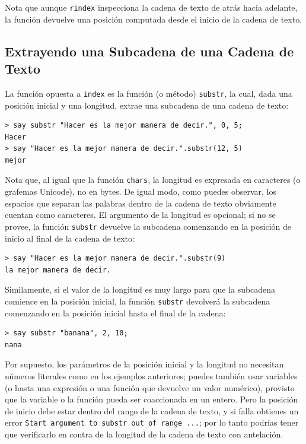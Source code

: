 Nota que aunque {\tt rindex} inspecciona la cadena de texto
de atrás hacia adelante, la función devuelve una posición
computada desde el inicio de la cadena de texto.

\subsection{Extrayendo una Subcadena de una Cadena de Texto}

La función opuesta a {\tt index} es la función (o método) {\tt substr},
la cual, dada una posición inicial y una longitud, extrae una subcadena
de una cadena de texto:

\begin{lstlisting}
> say substr "Hacer es la mejor manera de decir.", 0, 5;
Hacer
> say "Hacer es la mejor manera de decir.".substr(12, 5)
mejor
\end{lstlisting}
%

Nota que, al igual que la función {\tt chars}, la longitud es
expresada en caracteres (o grafemas Unicode), no en bytes.
De igual modo, como puedes observar, los espacios que separan
las palabras dentro de la cadena de texto obviamente cuentan 
como caracteres. El argumento de la longitud es opcional; 
si no se provee, la función {\tt substr} devuelve la subcadena
comenzando en la posición de inicio al final de la cadena de texto:

\begin{lstlisting}
> say "Hacer es la mejor manera de decir.".substr(9)
la mejor manera de decir.
\end{lstlisting}

Similamente, si el valor de la longitud es muy largo para que 
la subcadena comience en la posición inicial, la función
{\tt substr} devolverá la subcadena comenzando en la posición
inicial hasta el final de la cadena:

\begin{lstlisting}
> say substr "banana", 2, 10;
nana
\end{lstlisting}

Por supuesto, los parámetros de la posición inicial y la longitud 
no necesitan números literales como en los ejemplos anteriores; puedes
también usar variables (o hasta una expresión o una función que devuelve 
un valor numérico), provisto que la variable o la función pueda ser 
coaccionada en un entero. Pero la posición de inicio debe estar dentro 
del rango de la cadena de texto, y si falla obtienes un error 
{\tt Start argument to substr out of range ...}; por lo tanto
podrías tener que verificarlo en contra de la longitud de la 
cadena de texto con antelación.

